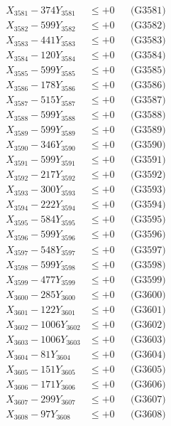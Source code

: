 \documentclass[a4paper,10pt]{article}
\begin{document}
{\begin{align}
\allowbreak
X_{3581} - 374Y_{3581} &\leq +0 && \text{(G3581)} \\
X_{3582} - 599Y_{3582} &\leq +0 && \text{(G3582)} \\
X_{3583} - 441Y_{3583} &\leq +0 && \text{(G3583)} \\
X_{3584} - 120Y_{3584} &\leq +0 && \text{(G3584)} \\
X_{3585} - 599Y_{3585} &\leq +0 && \text{(G3585)} \\
X_{3586} - 178Y_{3586} &\leq +0 && \text{(G3586)} \\
X_{3587} - 515Y_{3587} &\leq +0 && \text{(G3587)} \\
X_{3588} - 599Y_{3588} &\leq +0 && \text{(G3588)} \\
X_{3589} - 599Y_{3589} &\leq +0 && \text{(G3589)} \\
X_{3590} - 346Y_{3590} &\leq +0 && \text{(G3590)} \\
\allowbreak
X_{3591} - 599Y_{3591} &\leq +0 && \text{(G3591)} \\
X_{3592} - 217Y_{3592} &\leq +0 && \text{(G3592)} \\
X_{3593} - 300Y_{3593} &\leq +0 && \text{(G3593)} \\
X_{3594} - 222Y_{3594} &\leq +0 && \text{(G3594)} \\
X_{3595} - 584Y_{3595} &\leq +0 && \text{(G3595)} \\
X_{3596} - 599Y_{3596} &\leq +0 && \text{(G3596)} \\
X_{3597} - 548Y_{3597} &\leq +0 && \text{(G3597)} \\
X_{3598} - 599Y_{3598} &\leq +0 && \text{(G3598)} \\
X_{3599} - 477Y_{3599} &\leq +0 && \text{(G3599)} \\
X_{3600} - 285Y_{3600} &\leq +0 && \text{(G3600)} \\
\allowbreak
X_{3601} - 122Y_{3601} &\leq +0 && \text{(G3601)} \\
X_{3602} - 1006Y_{3602} &\leq +0 && \text{(G3602)} \\
X_{3603} - 1006Y_{3603} &\leq +0 && \text{(G3603)} \\
X_{3604} - 81Y_{3604} &\leq +0 && \text{(G3604)} \\
X_{3605} - 151Y_{3605} &\leq +0 && \text{(G3605)} \\
X_{3606} - 171Y_{3606} &\leq +0 && \text{(G3606)} \\
X_{3607} - 299Y_{3607} &\leq +0 && \text{(G3607)} \\
X_{3608} - 97Y_{3608} &\leq +0 && \text{(G3608)} \\

\end{align}}
\end{document}
